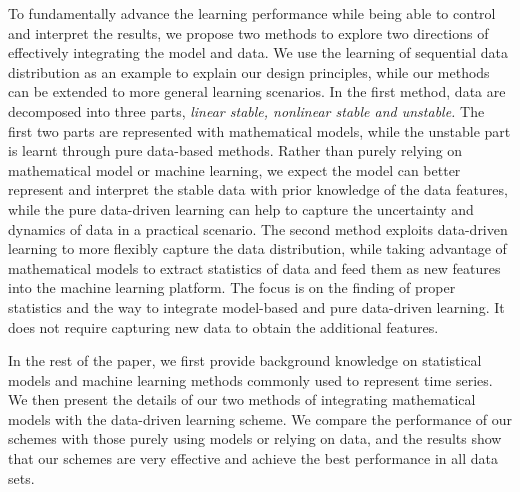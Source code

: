 To fundamentally advance the learning performance while being able to control and interpret the results,  we propose two methods to explore two directions of effectively integrating the model and data. We use the learning of sequential data distribution as an example to explain our design principles, while our methods can be extended to more general learning scenarios. In the first method,  data are decomposed into three parts, {\em linear stable, nonlinear stable and unstable.} The first two parts are represented with mathematical models, while the  unstable part is learnt  through pure data-based methods. Rather than purely relying on mathematical model or machine learning, we expect the model can better represent and interpret the stable data with prior knowledge of the data features, while the pure data-driven learning can help to capture the uncertainty and dynamics of data in a practical scenario.  The second method exploits data-driven learning to more flexibly capture the data distribution, while taking advantage of mathematical models to extract statistics of data and feed them as new features into the machine learning platform. The focus is on the finding of proper statistics and the way to integrate model-based and pure data-driven learning. It does not require capturing new data to obtain the additional features. %

In the rest of the paper, we first provide background knowledge on statistical models and machine learning methods commonly used to represent time series. We then present the details of our two methods of integrating mathematical models with the data-driven learning scheme. We compare the performance of our schemes with those purely using models or relying on data, and the results show that our schemes are very effective and achieve the best performance in all data sets.  


